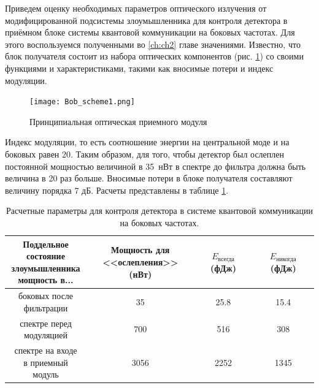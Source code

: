  Приведем оценку необходимых параметров оптического излучения от модифицированной подсистемы злоумышленника для контроля детектора в приёмном блоке системы квантовой коммуникации на боковых частотах. Для этого воспользуемся полученными во \ref{ch:ch2} главе значениями. Известно, что блок получателя состоит из набора оптических компонентов (рис. \ref{fig:Bob}) со своими функциями и характеристиками, такими как вносимые потери и индекс модуляции.

 
 \begin{figure}[ht]
  \centering
  \texttt{[image: Bob\_scheme1.png]}
  \caption{Принципиальная оптическая приемного модуля}
  \label{fig:Bob}
\end{figure}



Индекс модуляции, то есть соотношение энергии на центральной моде и на боковых равен 20. Таким образом, для того, чтобы детектор был ослеплен постоянной мощностью величиной в 35~нВт в спектре до фильтра должна быть величина в 20 раз больше.  Вносимые потери в блоке получателя составляют величину порядка 7 дБ. Расчеты представлены в таблице \ref{tab:blinding}.

 
 
\begin{table}
	\caption{\label{tab:blinding}Расчетные параметры для контроля детектора в системе квантовой коммуникации на боковых частотах.}
	\begin{tabular}[t]{c c c c}
	\hline\hline
	\makecell{Поддельное\\состояние\\злоумышленника\\мощность в...} & \makecell{Мощность для\\<<ослепления>> (нВт)} & $E_\text{всегда}$ (фДж) & $E_\text{никогда}$ (фДж) \\
	\hline
	\makecell{боковых после\\ фильтрации} & 35 & 25.8 & 15.4 \\
	\makecell{спектре перед\\ модуляцией} & 700 & 516 & 308 \\
	\makecell{спектре на входе\\ в приемный модуль} & 3056 & 2252 & 1345 \\
	\hline\hline
	\end{tabular}
\end{table}


\pagebreak


